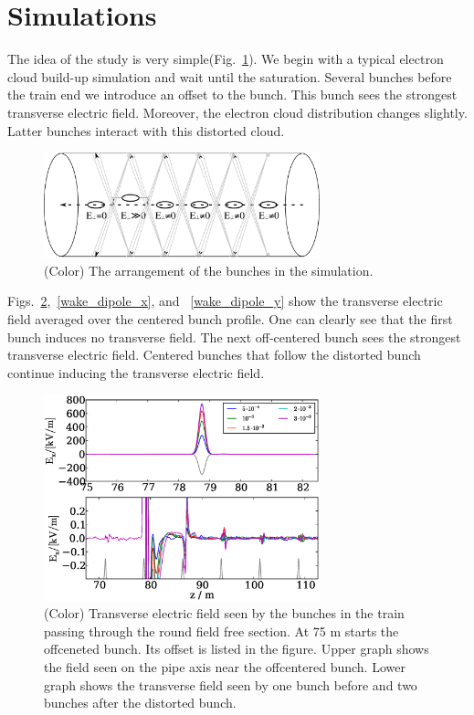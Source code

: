 \documentclass[5p]{elsarticle}%
\begin{document}
\section{Simulations}

The idea of the study is very simple(Fig.~\ref{offcentered}).
We begin with a typical electron cloud build-up simulation and wait until the saturation.
Several bunches before the train end we introduce an offset to the bunch.
This bunch sees the strongest transverse electric field.
Moreover, the electron cloud distribution changes slightly.
Latter bunches interact with this distorted cloud.


\begin{figure}[htb]
\centering
\includegraphics*[width=80mm]{data/offcentered.eps}
\caption{(Color) The arrangement of the bunches in the simulation.}
\label{offcentered}
\end{figure}

Figs.~\ref{wake_drift},~\ref{wake_dipole_x}, and ~\ref{wake_dipole_y} show the transverse electric field averaged over the centered bunch profile.
One can clearly see that the first bunch induces no transverse field.
The next off-centered bunch sees the strongest transverse electric field.
Centered bunches that follow the distorted bunch continue inducing the transverse electric field.


\begin{figure}[htb]
\centering
\includegraphics*[width=80mm]{data/round_drift_offset.eps}
\caption{(Color) Transverse electric field seen by the bunches in the train passing through the round field free section. At 75 m starts the offceneted bunch. Its offset is listed in the figure. Upper graph shows the field seen on the pipe axis near the offcentered bunch. Lower graph shows the transverse field seen by one bunch before and two bunches after the distorted bunch.}
\label{wake_drift}
\end{figure}
\end{document}
